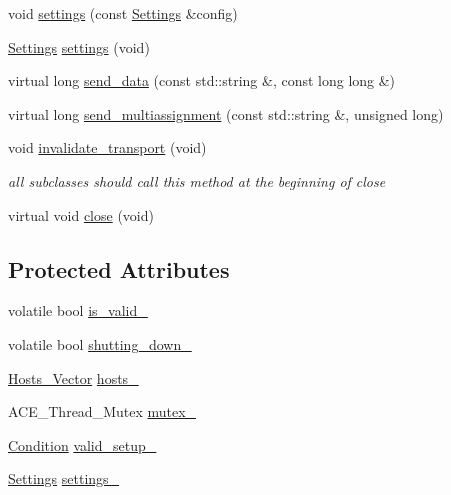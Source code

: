 \begin{DoxyCompactItemize}
void \hyperlink{classMadara_1_1Transport_1_1Base_a3a5fdc2b43d9840dbcf48aab4bc636ac}{settings} (const \hyperlink{classMadara_1_1Transport_1_1Settings}{Settings} \&config)
\item 
\hyperlink{classMadara_1_1Transport_1_1Settings}{Settings} \hyperlink{classMadara_1_1Transport_1_1Base_a6febe337ae99f9376bdb3ec05899db00}{settings} (void)
\item 
virtual long \hyperlink{classMadara_1_1Transport_1_1Base_a2c93fc45acc4f17a04f17387a4c9e18e}{send\_\-data} (const std::string \&, const long long \&)
\item 
virtual long \hyperlink{classMadara_1_1Transport_1_1Base_a5ecd1526eae6409ee19e97e8547da092}{send\_\-multiassignment} (const std::string \&, unsigned long)
\item 
void \hyperlink{classMadara_1_1Transport_1_1Base_a5feac684397b5098708ba9d16e8f1306}{invalidate\_\-transport} (void)
\begin{DoxyCompactList}\small\item\em all subclasses should call this method at the beginning of close \item\end{DoxyCompactList}\item 
virtual void \hyperlink{classMadara_1_1Transport_1_1Base_ab8101403aaecc565de66e0059e018978}{close} (void)
\end{DoxyCompactItemize}
\subsection*{Protected Attributes}
\begin{DoxyCompactItemize}
\item 
volatile bool \hyperlink{classMadara_1_1Transport_1_1Base_a77696ae1c39c0d0edc169882c4b82c23}{is\_\-valid\_\-}
\item 
volatile bool \hyperlink{classMadara_1_1Transport_1_1Base_a6c3d03895e92c93265704052ab707f8a}{shutting\_\-down\_\-}
\item 
\hyperlink{classMadara_1_1Transport_1_1Base_a2957ae0c413e07b7e276ae69ef1c320a}{Hosts\_\-Vector} \hyperlink{classMadara_1_1Transport_1_1Base_a19ac6cbfb41691ad4300a5e696e3b04e}{hosts\_\-}
\item 
ACE\_\-Thread\_\-Mutex \hyperlink{classMadara_1_1Transport_1_1Base_a81479f3b01798d0836dc44629c904450}{mutex\_\-}
\item 
\hyperlink{namespaceMadara_1_1Transport_a5dd6d9a7fb47cdbf2d1448242da4e13d}{Condition} \hyperlink{classMadara_1_1Transport_1_1Base_a82c2a7ef9058b2c9a520d900c9a9f6e0}{valid\_\-setup\_\-}
\item 
\hyperlink{classMadara_1_1Transport_1_1Settings}{Settings} \hyperlink{classMadara_1_1Transport_1_1Base_adafa1a5641aaecae76d963748bddf8e2}{settings\_\-}
\end{DoxyCompactItemize}


